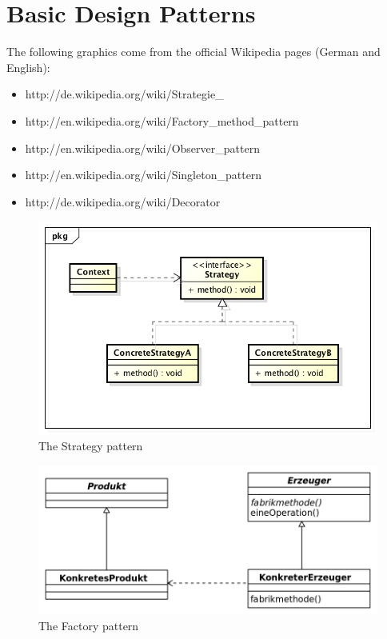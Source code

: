 \documentclass[../main/main.tex]{subfiles}
\begin{document}
\section{Basic Design Patterns}

The following graphics come from the official Wikipedia pages (German and English): 

\begin{itemize}
\item http://de.wikipedia.org/wiki/Strategie_%
\item http://en.wikipedia.org/wiki/Factory_method_pattern
\item http://en.wikipedia.org/wiki/Observer_pattern
\item http://en.wikipedia.org/wiki/Singleton_pattern
\item http://de.wikipedia.org/wiki/Decorator
\end{itemize}
\begin{figure}
  \includegraphics{../figures/strategy.png}  
  \caption{The Strategy pattern}
  \label{fig:strategy}
\end{figure}

\begin{figure}
  \includegraphics{../figures/factory.png}  
  \caption{The Factory pattern}
  \label{fig:factory}
\end{figure}
\end{document}
